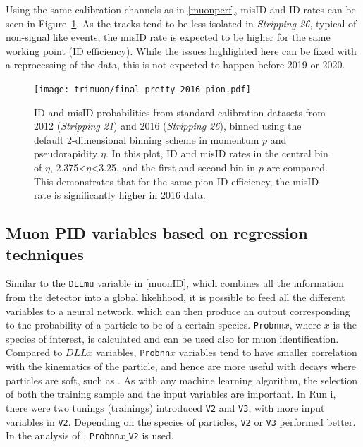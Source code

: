 Using the same calibration channels as in \autoref{muonperf}, misID and ID rates can be seen in Figure~\ref{fig:nSharedRun1andRun2}. As the tracks tend to be less isolated in \textit{Stripping 26}, typical of non-signal like events, the misID rate is expected to be higher for the same working point (ID efficiency). While the issues highlighted here can be fixed with a reprocessing of the data, this is not expected to happen before 2019 or 2020.

\begin{figure}[h!]
\centering
\texttt{[image: trimuon/final\_pretty\_2016\_pion.pdf]}
	\caption{ID and misID probabilities from standard calibration datasets from 2012 (\textit{Stripping 21}) and 2016 (\textit{Stripping 26}), binned using the default 2-dimensional binning scheme in momentum $p$ and pseudorapidity $\eta$. In this plot, ID and misID rates in the central bin of $\eta$, 2.375<$\eta$<3.25, and the first and second bin in $p$ are compared. This demonstrates that for the same pion ID efficiency, the misID rate is significantly higher in 2016 data.}
\label{fig:nSharedRun1andRun2}
\end{figure}

\subsection{Muon PID variables based on regression techniques }
Similar to the \texttt{DLLmu} variable in \autoref{muonID}, which combines all the information from the detector into a global likelihood, it is possible to feed all the different variables to a neural network, which can then produce an output corresponding to the probability of a particle to be of a certain species. \texttt{Probnn${x}$}, where $x$ is the species of interest, is calculated and can be used also for muon identification. Compared to $DLL{x}$ variables, \texttt{Probnn${x}$} variables tend to have smaller correlation with the kinematics of the particle, and hence are more useful with decays where particles are soft, such as \Bmumumu. As with any machine learning algorithm, the selection of both the training sample and the input variables are important. In Run \Rn{1}, there were two tunings (trainings) introduced \texttt{V2} and \texttt{V3}, with more input variables in \texttt{V2}. Depending on the species of particles, \texttt{V2} or \texttt{V3} performed better. In the analysis of \Bmumumu, \texttt{Probnn${x}\_$V2} is used.


